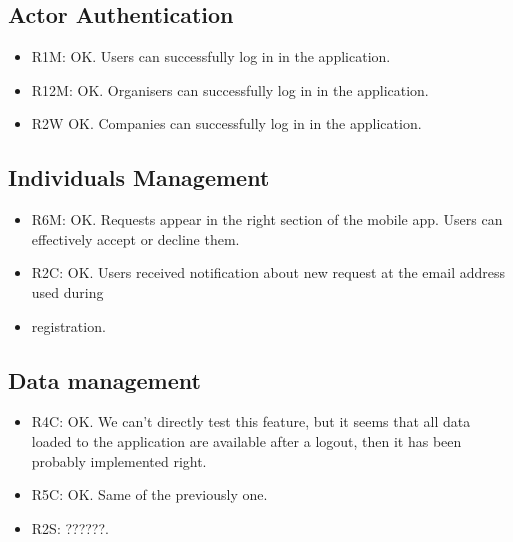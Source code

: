 \documentclass{article}
\begin{document}
\subsection{Actor Authentication}
\begin{itemize}
	\item R1M: OK. Users can successfully log in in the application.
	\item R12M: OK. Organisers can successfully log in in the application.
	\item R2W OK. Companies  can successfully log in in the application.
\end{itemize}

\subsection{Individuals Management}
\begin{itemize}
	\item R6M: OK. Requests appear in the right section of the mobile app. Users can effectively accept or decline them.
	\item R2C: OK. Users received notification about new request at the email address used during 
	\item registration.
\end{itemize}

\subsection{Data management}
\begin{itemize}
	\item R4C: OK. We can't directly test this feature, but it seems that all data loaded to the application are available after a logout, then it has been probably implemented right.
	\item R5C: OK. Same of the previously one.
	\item R2S: ??????.
\end{itemize}
\end{document}
